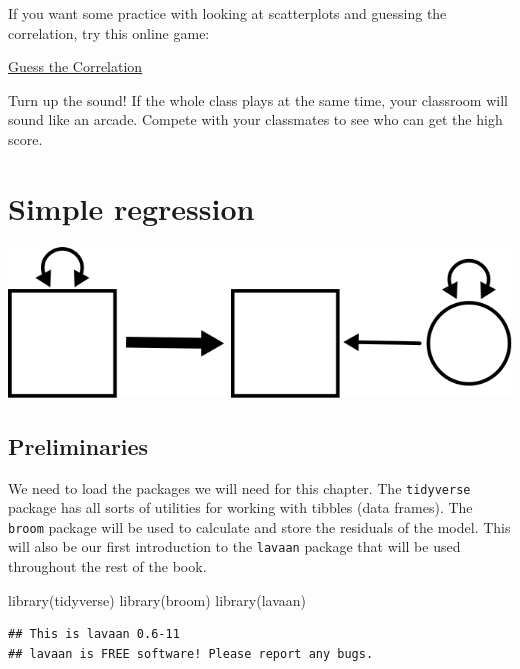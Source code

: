 \documentclass[
]{book}
\newenvironment{Shaded}{\begin{snugshade}}{\end{snugshade}}
\newcommand{\FunctionTok}[1]{\textcolor[rgb]{0.00,0.00,0.00}{#1}}
\newcommand{\NormalTok}[1]{#1}
\begin{document}
If you want some practice with looking at scatterplots and guessing the correlation, try this online game:

\href{http://guessthecorrelation.com/}{Guess the Correlation}

Turn up the sound! If the whole class plays at the same time, your classroom will sound like an arcade. Compete with your classmates to see who can get the high score.

\hypertarget{simple}{%
\chapter{Simple regression}\label{simple}}

\begin{center}\includegraphics{graphics/simple_regression} \end{center}

\hypertarget{preliminaries}{%
\section*{Preliminaries}\label{preliminaries}}

We need to load the packages we will need for this chapter. The \texttt{tidyverse} package has all sorts of utilities for working with tibbles (data frames). The \texttt{broom} package will be used to calculate and store the residuals of the model. This will also be our first introduction to the \texttt{lavaan} package that will be used throughout the rest of the book.

\begin{Shaded}
\begin{Highlighting}[]
\FunctionTok{library}\NormalTok{(tidyverse)}
\FunctionTok{library}\NormalTok{(broom)}
\FunctionTok{library}\NormalTok{(lavaan)}
\end{Highlighting}
\end{Shaded}

\begin{verbatim}
## This is lavaan 0.6-11
## lavaan is FREE software! Please report any bugs.
\end{verbatim}
\end{document}
